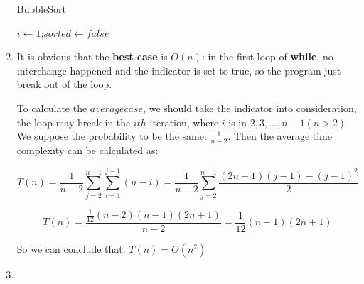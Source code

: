 \documentclass[12pt,a4paper]{article}
\makeatletter
\newtheorem*{solution}{Solution}
\theoremstyle{definition}
\renewenvironment{solution}[1][Solution] {\par\pushQED{\qed}\normalfont\topsep6\p@\@plus6\p@\relax\trivlist\item[\hskip\labelsep\bfseries#1\@addpunct{.}]\ignorespaces}{\popQED\endtrivlist\@endpefalse} \makeatother
\makeatother
\begin{document}
\begin{enumerate}
\begin{minipage}[t]{0.8\textwidth}
\begin{algorithm}[H]
        \BlankLine
        \caption{BubbleSort}\label{Alg_Bubble}

        $i\leftarrow 1$;$sorted\leftarrow false$\;

    \end{algorithm}
    \end{minipage}

    \begin{solution}
   
     It is obvious that the \textbf{best case} is $O(n)$: in the first loop of \textbf{while}, no interchange happened and the indicator is set to
       true, so the program just break out of the loop.
 
       To calculate the $average case$, we should take the indicator into consideration, the loop may break in the $ith$ iteration, where $i$ 
       is in ${2, 3, ..., n - 1}(n > 2)$. We suppose the probability to be the same: $\frac{1}{n - 2}$. Then the average time complexity can 
       be calculated as:

       \begin{equation*}
           T(n) = \frac{1}{n - 2}\sum_{j = 2}^{n - 1}\sum_{i = 1}^{j - 1}(n - i) = \frac{1}{n - 2}\sum_{j = 2}^{n - 1}\frac{(2n - 1)(j - 1) - (j - 1)^2}{2}
       \end{equation*}
       
       \begin{equation*}
        T(n) = \frac{\frac{1}{12}(n - 2)(n - 1)(2n + 1)}{n - 2} = \frac{1}{12}(n - 1)(2n + 1)
    \end{equation*}
        
    So we can conclude that: $T(n) = O(n^2)$

       

    \end{solution}

    \item


\end{enumerate}
\end{document}

